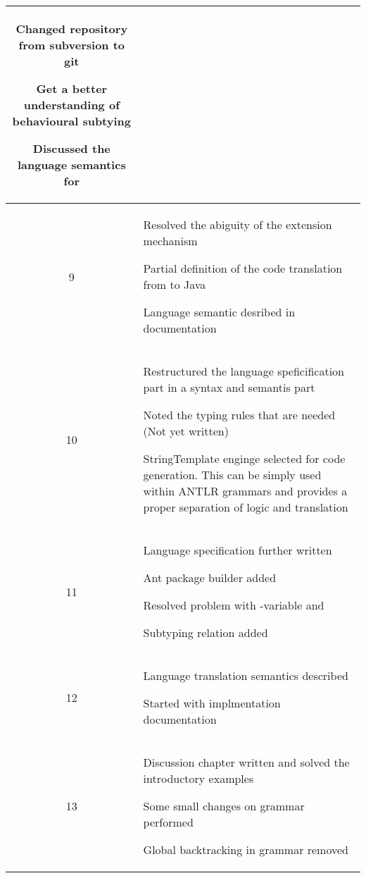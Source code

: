 \begin{center}
\begin{longtable}{|c|p{12cm}|}
\begin{journal}
	\item Changed repository from subversion to git
	\item Get a better understanding of behavioural subtying
	\item Discussed the language semantics for \mytype
\end{journal}
\\ \hline
9 &
\begin{journal}
	\item Resolved the abiguity of the extension mechanism
	\item Partial definition of the code translation from \ooplss to Java
	\item Language semantic desribed in documentation
\end{journal}
\\ \hline
10 &
\begin{journal}
	\item Restructured the language speficification part in a syntax and semantis part
	\item Noted the typing rules that are needed (Not yet written)
	\item StringTemplate enginge selected for code generation. This can be simply used within ANTLR grammars and provides a proper separation of logic and translation
\end{journal}
\\ \hline
11 &
\begin{journal}
	\item Language specification further written
	\item Ant package builder added
	\item Resolved problem with \self-variable and \mytype
	\item Subtyping relation added
\end{journal}
\\ \hline
12 &
\begin{journal}
	\item Language translation semantics described
	\item Started with implmentation documentation
\end{journal}
\\ \hline
13 &
\begin{journal}
	\item Discussion chapter written and solved the introductory examples
	\item Some small changes on grammar performed
	\item Global backtracking in grammar removed

\end{journal}
\end{longtable}
\end{center}
